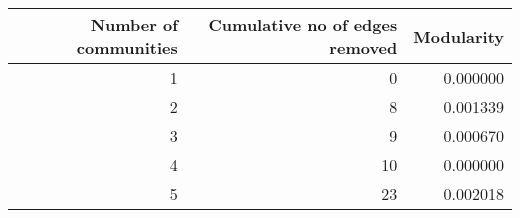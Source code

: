 \begin{tabular}{rrr}
\toprule
 Number of communities &  Cumulative no of edges removed &  Modularity \\
\midrule
                     1 &                               0 &    0.000000 \\
                     2 &                               8 &    0.001339 \\
                     3 &                               9 &    0.000670 \\
                     4 &                              10 &    0.000000 \\
                     5 &                              23 &    0.002018 \\
\bottomrule
\end{tabular}
